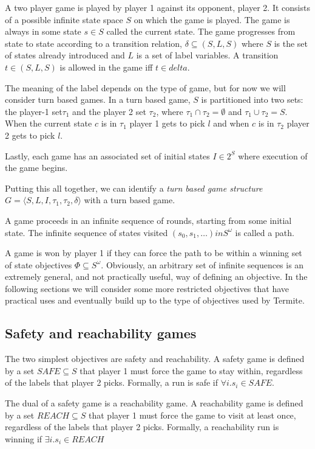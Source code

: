 \documentclass{article}
\begin{document}
A two player game is played by player 1 against its opponent, player 2. It consists of a possible infinite state space $S$ on which the game is played. The game is always in some state $s \in S$ called the current state. The game progresses from state to state according to a transition relation, $\delta \subseteq (S, L, S)$ where $S$ is the set of states already introduced and $L$ is a set of label variables. A transition $t \in (S, L, S)$ is allowed in the game iff $t \in delta$. 

The meaning of the label depends on the type of game, but for now we will consider turn based games. In a turn based game, $S$ is partitioned into two sets: the player-1 set$\tau_1$ and the player 2 set $\tau_2$, where $\tau_1 \cap \tau_2 = \emptyset$ and $ \tau_1 \cup \tau_2 = S$. When the current state $c$ is in $\tau_1$ player 1 gets to pick $l$ and when $c$ is in $\tau_2$ player 2 gets to pick $l$.

Lastly, each game has an associated set of initial states $I \in 2^S$ where execution of the game begins.

Putting this all together, we can identify a \emph{turn based game structure} $G = \langle S,L,I,\tau_1,\tau_2,\delta \rangle$ with a turn based game.

A game proceeds in an infinite sequence of rounds, starting from some initial state. The infinite sequence of states visited $(s_0, s_1,\ldots) in S^\omega$ is called a path. 

A game is won by player 1 if they can force the path to be within a winning set of state objectives $\Phi \subseteq S^\omega$. Obviously, an arbitrary set of infinite sequences is an extremely general, and not practically useful, way of defining an objective. In the following sections we will consider some more restricted objectives that have practical uses and eventually build up to the type of objectives used by Termite. 

\subsection{Safety and reachability games}

The two simplest objectives are safety and reachability. A safety game is defined by a set $SAFE \subseteq S$ that player 1 must force the game to stay within, regardless of the labels that player 2 picks. Formally, a run is safe if $\forall i. s_i \in SAFE$. 

The dual of a safety game is a reachability game. A reachability game is defined by a set $REACH \subseteq S$ that player 1 must force the game to visit at least once, regardless of the labels that player 2 picks. Formally, a reachability run is winning if $\exists i. s_i \in REACH$
\end{document}

